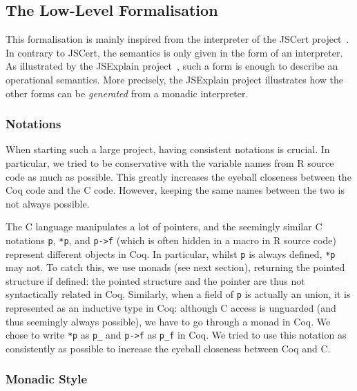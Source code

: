 \documentclass{article}
\newcommand\Coq{Coq}
\newcommand\R{R}
\newcommand\Cn{C}
\begin{document}
\subsection{The Low-Level Formalisation}
\label{sec:low:level}

This formalisation is mainly inspired from the interpreter
of the JSCert project~\parencite{bodin2014trusted}.
In contrary to JSCert, the semantics is only given in the form
of an interpreter.
As illustrated by the JSExplain project~\parencite{JSExplain},
such a form is enough to describe an operational semantics.
More precisely, the JSExplain project illustrates
how the other forms can be \emph{generated} from a monadic interpreter.

\subsubsection{Notations}
\label{sec:notations}

When starting such a large project,
having consistent notations is crucial.
In particular,
we tried to be conservative with the variable names from
\R{} source code as much as possible.
This greatly increases the eyeball closeness between
the \Coq{} code and the \Cn{} code.
However, keeping the same names between the two
is not always possible.

The \Cn{} language manipulates a lot of pointers,
and the seemingly similar \Cn{} notations \texttt{p},
\texttt{*p}, and \texttt{p->f}
(which is often hidden in a macro in \R{} source code)
represent different objects in \Coq{}.
In particular, whilst \texttt{p} is always defined,
\texttt{*p} may not.
To catch this, we use monads (see next section),
returning the pointed structure if defined:
the pointed structure and the pointer are thus not
syntactically related in \Coq{}.
Similarly, when a field of \texttt{p} is actually an union,
it is represented as an inductive type in \Coq{}:
although \Cn{} access is unguarded
(and thus seemingly always possible),
we have to go through a monad in \Coq{}.
We chose to write \texttt{*p} as \texttt{p_}
and \texttt{p->f} as \texttt{p_f} in \Coq{}.
We tried to use this notation as consistently as possible
to increase the eyeball closeness between \Coq{} and \Cn{}.


\subsubsection{Monadic Style}
\label{sec:monadic:style}
\end{document}
